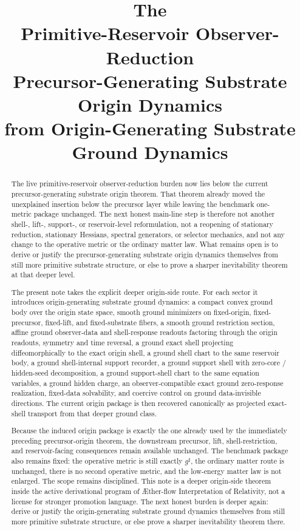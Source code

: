 \documentclass[11pt]{article}
\title{\textbf{The \TheoryName{}}\\[0.4em]
\large Primitive-Reservoir Observer-Reduction\\
\large Precursor-Generating Substrate Origin Dynamics\\
\large from Origin-Generating Substrate Ground Dynamics}
\author{}
\date{}
\newcommand{\Aflow}{\AE{}ther-flow}
\newcommand{\TheoryName}{\Aflow{} Interpretation of Relativity}
\newcommand{\CompletedMetric}{g^{\sharp}}
\begin{document}
\maketitle

\begin{abstract}
The live primitive-reservoir observer-reduction burden now lies below the current precursor-generating substrate origin theorem. That theorem already moved the unexplained insertion below the precursor layer while leaving the benchmark one-metric package unchanged. The next honest main-line step is therefore not another shell-, lift-, support-, or reservoir-level reformulation, not a reopening of stationary reduction, stationary Hessians, spectral generators, or selector mechanics, and not any change to the operative metric or the ordinary matter law. What remains open is to derive or justify the precursor-generating substrate origin dynamics themselves from still more primitive substrate structure, or else to prove a sharper inevitability theorem at that deeper level.

The present note takes the explicit deeper origin-side route. For each sector it introduces origin-generating substrate ground dynamics: a compact convex ground body over the origin state space, smooth ground minimizers on fixed-origin, fixed-precursor, fixed-lift, and fixed-substrate fibers, a smooth ground restriction section, affine ground observer-data and shell-response readouts factoring through the origin readouts, symmetry and time reversal, a ground exact shell projecting diffeomorphically to the exact origin shell, a ground shell chart to the same reservoir body, a ground shell-internal support recorder, a ground support shell with zero-core / hidden-seed decomposition, a ground support-shell chart to the same equation variables, a ground hidden charge, an observer-compatible exact ground zero-response realization, fixed-data solvability, and coercive control on ground data-invisible directions. The current origin package is then recovered canonically as projected exact-shell transport from that deeper ground class.

Because the induced origin package is exactly the one already used by the immediately preceding precursor-origin theorem, the downstream precursor, lift, shell-restriction, and reservoir-facing consequences remain available unchanged. The benchmark package also remains fixed: the operative metric is still exactly \(\CompletedMetric\), the ordinary matter route is unchanged, there is no second operative metric, and the low-energy matter law is not enlarged. The scope remains disciplined. This note is a deeper origin-side theorem inside the active derivational program of \TheoryName{}, not a license for stronger promotion language. The next honest burden is deeper again: derive or justify the origin-generating substrate ground dynamics themselves from still more primitive substrate structure, or else prove a sharper inevitability theorem there.
\end{abstract}
\end{document}
